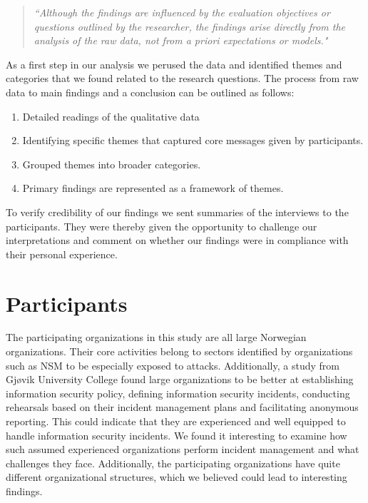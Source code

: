\begin{quote}
\textit{``Although the findings are influenced by the evaluation objectives or
questions outlined by the researcher, the findings arise directly from the analysis of the raw data, not from a priori expectations or models."}
\end{quote}

As a first step in our analysis we perused the data and identified themes and categories that we found related to the research questions. The process from raw data to main findings and a conclusion can be outlined as follows:

\begin{enumerate}
\vspace{0,5cm}
\item Detailed readings of the qualitative data
\item Identifying specific themes that captured core messages given by participants.
\item Grouped themes into broader categories.
\item Primary findings are represented as a framework of themes.
\vspace{0,5cm}
\end{enumerate}

To verify credibility of our findings we sent summaries of the interviews to the participants. They were thereby given the opportunity to challenge our interpretations and comment on whether our findings were in compliance with their personal experience. 

\section{Participants}
The participating organizations in this study are all large Norwegian organizations. Their core activities belong to sectors identified by organizations such as \acs{NSM} to be especially exposed to attacks. Additionally, a study from Gj\o vik University College \cite{sand2010hendelseshaandtering} found large organizations to be better at establishing information security policy, defining information security incidents, conducting rehearsals based on their incident management plans and facilitating anonymous reporting. This could indicate that they are experienced and well equipped to handle information security incidents. We found it interesting to examine how such assumed experienced organizations perform incident management and what challenges they face. Additionally, the participating organizations have quite different organizational structures, which we believed could lead to interesting findings.

